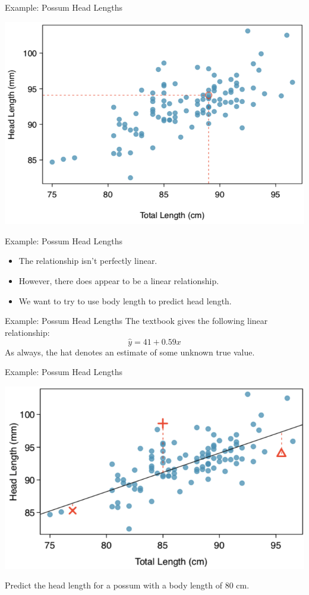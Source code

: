 \begin{frame}{Example: Possum Head Lengths}
    \begin{center}
        \includegraphics[scale=0.35]{images/possumscatter.png}
    \end{center}
\end{frame}

\begin{frame}{Example: Possum Head Lengths}
    \begin{itemize}
        \item The relationship isn't perfectly linear.
        \item However, there does appear to be a linear relationship.
        \item We want to try to use body length to predict head length.
    \end{itemize}
\end{frame}

\begin{frame}{Example: Possum Head Lengths}
    The textbook gives the following linear relationship:
    \[
        \hat{y} = 41 + 0.59x
    \]
    As always, the hat denotes an estimate of some unknown true value. 
\end{frame}

\begin{frame}{Example: Possum Head Lengths}
    \begin{center}
        \includegraphics[scale=0.35]{images/possreg.png}
    \end{center}
    Predict the head length for a possum with a body length of 80 cm. 
\end{frame}

